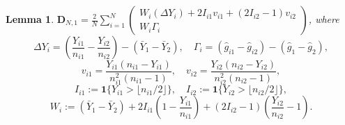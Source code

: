 \documentclass[10pt,a4paper]{amsart}
\newtheorem{lemma}{Lemma}
\begin{document}
\begin{lemma}\label{lemma:D:N,1:rewritten}
$\displaystyle\mathbf{D}_{N,1}=\frac{2}{N}\sum_{i=1}^N\begin{pmatrix}
    W_i(\Delta Y_i)+2I_{i1}v_{i1}+(2I_{i2}-1)v_{i2}\\
    W_i\Gamma_i
\end{pmatrix}$,
where
$$\Delta Y_i=\left(\frac{Y_{i1}}{n_{i1}}-\frac{Y_{i2}}{n_{i2}}\right)-(\bar{Y}_1-\bar{Y}_2),\quad \Gamma_i=(\hat{g}_{i1}-\hat{g}_{i2})-(\hat{g}_1-\hat{g}_2),$$
$$v_{i1}=\frac{Y_{i1}(n_{i1}-Y_{i1})}{n_{i1}^2(n_{i1}-1)},\quad v_{i2}=\frac{Y_{i2}(n_{i2}-Y_{i2})}{n_{i2}^2(n_{i2}-1)},$$
$$I_{i1}:=\mathbf{1}\{Y_{i1}>\lfloor n_{i1}/2\rfloor\},\quad I_{i2}:=\mathbf{1}\{Y_{i2}>\lfloor n_{i2}/2\rfloor\},$$
$$W_i:=(\bar{Y}_1-\bar{Y}_2)+2I_{i1}\left(1-\frac{Y_{i1}}{n_{i1}}\right)+(2I_{i2}-1)\left(\frac{Y_{i2}}{n_{i2}}-1\right).$$
\end{lemma}
\end{document}

